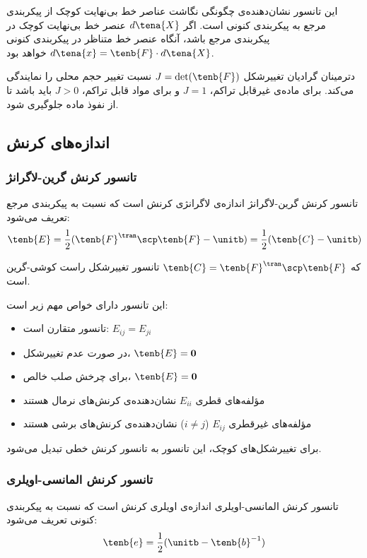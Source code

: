 این تانسور نشان‌دهنده‌ی چگونگی نگاشت عناصر خط بی‌نهایت کوچک از پیکربندی مرجع به پیکربندی کنونی است. اگر $d\tena{X}$ عنصر خط بی‌نهایت کوچک در پیکربندی مرجع باشد، آنگاه عنصر خط متناظر در پیکربندی کنونی $d\tena{x} = \tenb{F} \cdot d\tena{X}$ خواهد بود.

دترمینان گرادیان تغییرشکل $J = \det(\tenb{F})$ نسبت تغییر حجم محلی را نمایندگی می‌کند. برای ماده‌ی غیرقابل تراکم، $J = 1$ و برای مواد قابل تراکم، $J > 0$ باید باشد تا از نفوذ ماده جلوگیری شود.

\subsection{اندازه‌های کرنش}

\subsubsection{تانسور کرنش گرین-لاگرانژ}

تانسور کرنش گرین-لاگرانژ اندازه‌ی لاگرانژی کرنش است که نسبت به پیکربندی مرجع تعریف می‌شود:
\begin{equation}
	\tenb{E} = \frac{1}{2}(\tenb{F}^\tran \scp \tenb{F} - \unitb) = \frac{1}{2}(\tenb{C} - \unitb)
\end{equation}

که $\tenb{C} = \tenb{F}^\tran \scp \tenb{F}$ تانسور تغییرشکل راست کوشی-گرین است.

این تانسور دارای خواص مهم زیر است:
\begin{itemize}
	\item تانسور متقارن است: $E_{ij} = E_{ji}$
	\item در صورت عدم تغییرشکل، $\tenb{E} = \mathbf{0}$
	\item برای چرخش صلب خالص، $\tenb{E} = \mathbf{0}$
	\item مؤلفه‌های قطری $E_{ii}$ نشان‌دهنده‌ی کرنش‌های نرمال هستند
	\item مؤلفه‌های غیرقطری $E_{ij}$ ($i \neq j$) نشان‌دهنده‌ی کرنش‌های برشی هستند
\end{itemize}

برای تغییرشکل‌های کوچک، این تانسور به تانسور کرنش خطی تبدیل می‌شود.

\subsubsection{تانسور کرنش المانسی-اویلری}

تانسور کرنش المانسی-اویلری اندازه‌ی اویلری کرنش است که نسبت به پیکربندی کنونی تعریف می‌شود:
\begin{equation}
	\tenb{e} = \frac{1}{2}(\unitb - \tenb{b}^{-1})
\end{equation}

